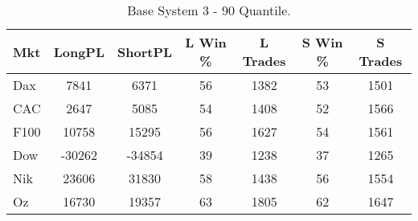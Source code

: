 \begin{table}[ht]
\centering
\caption[Base System 3]{Base System 3 - 90 Quantile.} 
\label{tab:q_90_results}
\begin{tabular}{lcccccc}
  \toprule Mkt & LongPL & ShortPL & L Win \% & L Trades & S Win \% & S Trades \\ 
  \midrule Dax & 7841 & 6371 & 56 & 1382 & 53 & 1501 \\ 
  CAC & 2647 & 5085 & 54 & 1408 & 52 & 1566 \\ 
  F100 & 10758 & 15295 & 56 & 1627 & 54 & 1561 \\ 
  Dow & -30262 & -34854 & 39 & 1238 & 37 & 1265 \\ 
  Nik & 23606 & 31830 & 58 & 1438 & 56 & 1554 \\ 
  Oz & 16730 & 19357 & 63 & 1805 & 62 & 1647 \\ 
   \bottomrule \end{tabular}
\end{table}
